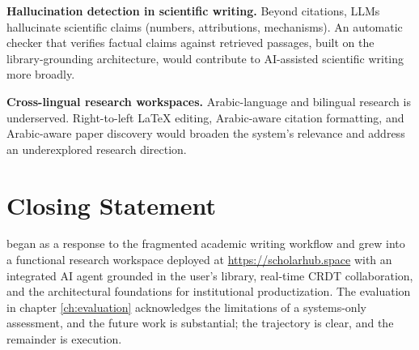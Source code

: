 \textbf{Hallucination detection in scientific writing.} Beyond citations, LLMs hallucinate scientific claims (numbers, attributions, mechanisms). An automatic checker that verifies factual claims against retrieved passages, built on the library-grounding architecture, would contribute to AI-assisted scientific writing more broadly.

\textbf{Cross-lingual research workspaces.} Arabic-language and bilingual research is underserved. Right-to-left LaTeX editing, Arabic-aware citation formatting, and Arabic-aware paper discovery would broaden the system's relevance and address an underexplored research direction.

\section{Closing Statement}

\sh{} began as a response to the fragmented academic writing workflow and grew into a functional research workspace deployed at \url{https://scholarhub.space} with an integrated AI agent grounded in the user's library, real-time CRDT collaboration, and the architectural foundations for institutional productization. The evaluation in chapter \ref{ch:evaluation} acknowledges the limitations of a systems-only assessment, and the future work is substantial; the trajectory is clear, and the remainder is execution.
